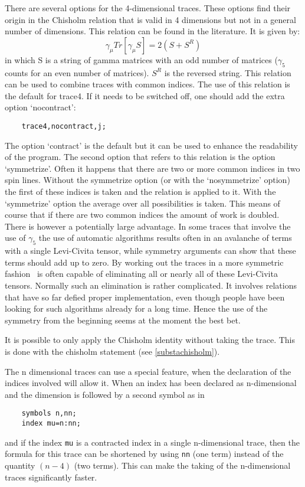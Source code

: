 There are several options for the 4-dimensional traces. These options find 
their origin in the Chisholm relation that is valid in 4 
dimensions but not in a general number of dimensions. This relation can be 
found in the literature. It is given by:
\begin{equation}
    \gamma_\mu Tr[\gamma_\mu S] = 2(S + S^R)
\end{equation}
\noindent in which S is a string of gamma matrices with an odd number of 
matrices ($\gamma_5$ counts for an even number of matrices). $S^R$ is the 
reversed string. This relation can be used to combine traces with common 
indices. The use of this relation is the default for trace4. 
If it needs to be switched off, one should add the extra option
`nocontract':
\begin{verbatim}
    trace4,nocontract,j;
\end{verbatim}
The option `contract' is the default but it can be used to 
enhance the readability of the program. The second option that refers to 
this relation is the option `symmetrize'. Often it 
happens that there are two or more common indices in two spin lines. 
Without the symmetrize option (or with the 
`nosymmetrize' option) the first of these indices is 
taken and the relation is applied to it. With the `symmetrize' option 
the average over all possibilities is taken. This means of course that if 
there are two common indices the amount of work is doubled. There is 
however a potentially large advantage. In some traces that involve the use of 
$\gamma_5$ the use of automatic algorithms results often in an avalanche of 
terms with a single Levi-Civita tensor, while symmetry arguments can show 
that these terms should add up to zero. By working out the traces in a more 
symmetric fashion \FORM\ is often capable of eliminating all or nearly all of 
these Levi-Civita tensors. Normally such an elimination is rather 
complicated. It involves relations that have so far defied proper 
implementation, even though people have been looking for such algorithms 
already for a long time. Hence the use of the symmetry from the beginning 
seems at the moment the best bet.

It is possible to only apply the Chisholm identity without 
taking the trace. This is done with the chisholm statement (see 
\ref{substachisholm}). 

The n dimensional traces can use a special feature, when the declaration 
of the indices involved will allow it. When an index has been declared 
as n-dimensional and the dimension is followed by a second symbol as in
\begin{verbatim}
    symbols n,nn;
    index mu=n:nn;
\end{verbatim}
and if the index \verb:mu: is a contracted index in a single 
n-dimensional trace, then the formula for this trace can be shortened by 
using \verb:nn: (one term) instead of the quantity $(n-4)$ (two terms). 
This can make the taking of the n-dimensional traces significantly 
faster.

